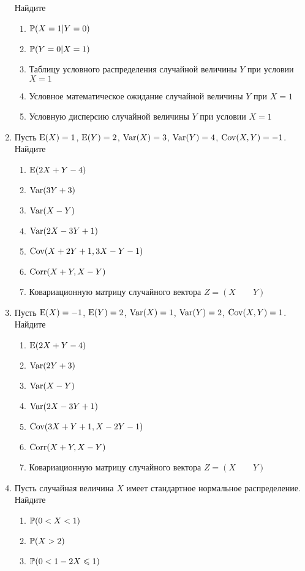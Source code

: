 \begin{enumerate}
Найдите
\begin{enumerate}
\item $\P(X = 1 | Y = 0)$
\item $\P(Y = 0 | X = 1)$
\item Таблицу условного распределения случайной величины $Y$ при условии $X = 1$
\item Условное математическое ожидание случайной величины $Y$ при $X = 1$
\item Условную дисперсию случайной величины $Y$ при условии $X = 1$
\end{enumerate}

\item Пусть $\E(X)=1$, $\E(Y)=2$, $\Var(X) = 3$, $\Var(Y) = 4$, $\Cov(X,Y) = -1$. Найдите
\begin{enumerate}
\item $\E(2X + Y - 4)$
\item $\Var(3Y + 3)$
\item $\Var(X - Y)$
\item $\Var(2X - 3Y +1)$
\item $\Cov(X+ 2Y + 1,3X - Y -1)$
\item $\Corr(X + Y, X - Y)$
\item Ковариационную матрицу случайного вектора $Z = (X \qquad Y)$
\end{enumerate}


\item Пусть $\E(X)=-1$, $\E(Y)=2$, $\Var(X) = 1$, $\Var(Y) = 2$, $\Cov(X,Y) = 1$. Найдите
\begin{enumerate}
\item $\E(2X + Y - 4)$
\item $\Var(2Y + 3)$
\item $\Var(X - Y)$
\item $\Var(2X - 3Y +1)$
\item $\Cov(3X+ Y + 1,X - 2Y -1)$
\item $\Corr(X + Y, X - Y)$
\item Ковариационную матрицу случайного вектора $Z = (X \qquad Y)$
\end{enumerate}

\item Пусть случайная величина $X$ имеет стандартное нормальное распределение.
Найдите
\begin{enumerate}
\item $\P(0 < X < 1)$
\item $\P(X > 2)$
\item $\P(0 < 1 - 2X \leq 1)$
\end{enumerate}


\end{enumerate}
